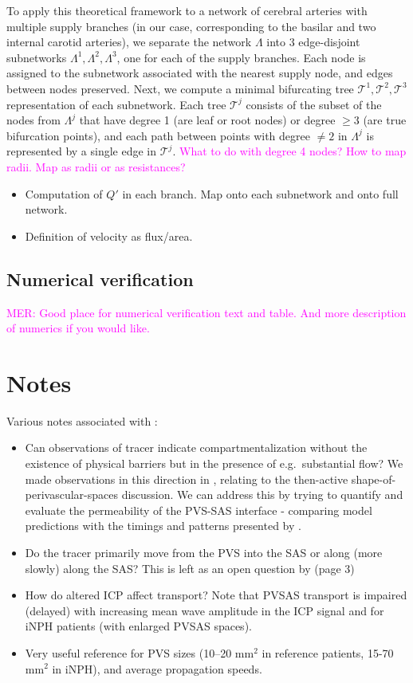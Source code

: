 \documentclass[fleqn,10pt]{wlscirep}
\newcommand{\mer}[1]{\textcolor{magenta}{#1}}
\begin{document}
To apply this theoretical framework to a network of cerebral arteries
with multiple supply branches (in our case, corresponding to the
basilar and two internal carotid arteries), we separate the network
$\Lambda$ into 3 edge-disjoint subnetworks $\Lambda^1, \Lambda^2,
\Lambda^3$, one for each of the supply branches. Each node is assigned
to the subnetwork associated with the nearest supply node, and edges
between nodes preserved. Next, we compute a minimal bifurcating tree
$\mathcal{T}^1, \mathcal{T}^2, \mathcal{T}^3$ representation of each
subnetwork. Each tree $\mathcal{T}^j$ consists of the subset of the
nodes from $\Lambda^j$ that have degree 1 (are leaf or root nodes) or
degree $\geq 3$ (are true bifurcation points), and each path between
points with degree $\not = 2$ in $\Lambda^j$ is represented by a single
edge in $\mathcal{T}^j$. \mer{What to do with degree 4 nodes? How to map radii. Map as radii or as resistances?}

\begin{itemize}
\item
  Computation of $Q'$ in each branch. Map onto each subnetwork and
  onto full network.
\item
  Definition of velocity as flux/area.
\end{itemize}
  

\subsection{Numerical verification}

\mer{MER: Good place for numerical verification text and table. And more description of numerics if you would like.}


\newpage
\section{Notes}

Various notes associated with \cite{eide2024functional}:
\begin{itemize}
  \item
    Can observations of tracer indicate compartmentalization without
    the existence of physical barriers but in the presence of
    e.g.~substantial flow? We made observations in this direction in
    \cite{vinje2021brain}, relating to the then-active
    shape-of-perivascular-spaces discussion. We can address this by
    trying to quantify and evaluate the permeability of the PVS-SAS
    interface - comparing model predictions with the timings and
    patterns presented by \cite{eide2024functional}.
  \item
    Do the tracer primarily move from the PVS into the SAS or along
    (more slowly) along the SAS? This is left as an open question by
    \cite{eide2024functional} (page 3)
  \item
    How do altered ICP affect transport? Note that PVSAS transport is
    impaired (delayed) with increasing mean wave amplitude in the ICP
    signal and for iNPH patients (with enlarged PVSAS spaces).
  \item
    Very useful reference for PVS sizes (10--20 mm$^2$ in reference
    patients, 15-70 mm$^2$ in iNPH), and average propagation speeds.
\end{itemize}
\end{document}
